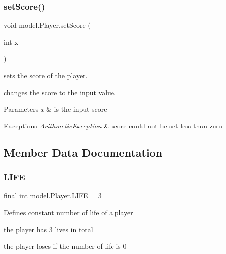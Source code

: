 \subsubsection{\texorpdfstring{set\+Score()}{setScore()}}
{\footnotesize\ttfamily void model.\+Player.\+set\+Score (\begin{DoxyParamCaption}\item[{int}]{x }\end{DoxyParamCaption})}



sets the score of the player. 

changes the score to the input value. 
\begin{DoxyParams}{Parameters}
{\em x} & is the input score \\
\hline
\end{DoxyParams}

\begin{DoxyExceptions}{Exceptions}
{\em Arithmetic\+Exception} & score could not be set less than zero \\
\hline
\end{DoxyExceptions}


\subsection{Member Data Documentation}
\hypertarget{classmodel_1_1_player_a59153913ee338710aa1a33b68e5d0dbd}{}\label{classmodel_1_1_player_a59153913ee338710aa1a33b68e5d0dbd} 
\subsubsection{\texorpdfstring{L\+I\+FE}{LIFE}}
{\footnotesize\ttfamily final int model.\+Player.\+L\+I\+FE = 3\hspace{0.3cm}{\ttfamily [private]}}

Defines constant number of life of a player
\begin{DoxyItemize}
\item the player has 3 lives in total
\item the player loses if the number of life is 0 
\end{DoxyItemize}\hypertarget{classmodel_1_1_player_ad422bd3896f6c86c74fe49be0cae6759}{}\label{classmodel_1_1_player_ad422bd3896f6c86c74fe49be0cae6759} 
